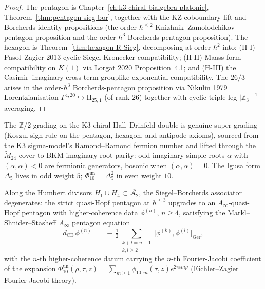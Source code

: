 \begin{proof}
The pentagon is Chapter~\ref{ch:k3-chiral-bialgebra-platonic},
Theorem~\ref{thm:pentagon-sieg-bor}, together with the KZ coboundary lift and
Borcherds identity propositions (the order-$\hbar^{\leq 2}$ Knizhnik--Zamolodchikov pentagon proposition
and the order-$\hbar^3$ Borcherds-pentagon proposition). The hexagon is
Theorem~\ref{thm:hexagon-R-Sieg}, decomposing at order
$\hbar^2$ into: (H-I) Pasol--Zagier 2013 cyclic Siegel-Kronecker compatibility;
(H-II) Maass-form compatibility on $K(1)$ via Lorgat 2020 Proposition~4.1; and
(H-III) the Casimir--imaginary cross-term grouplike-exponential compatibility.
The $26/3$ arises in the order-$\hbar^3$ Borcherds-pentagon proposition via Nikulin
1979 Lorentzianisation $\Gamma^{4,20}\hookrightarrow\mathrm{II}_{25,1}$
(of rank $26$) together with cyclic triple-leg $|\mathbb{Z}_3|^{-1}$
averaging.
\end{proof}

\begin{theorem}
\label{thm:qca-super-A-infty-upgrade}
The $\mathbb{Z}/2$-grading on the K3 chiral Hall--Drinfeld double is genuine
super-grading (Koszul sign rule on the pentagon, hexagon, and antipode axioms),
sourced from the K3 sigma-model's Ramond--Ramond fermion number and lifted
through the $\widetilde{M}_{24}$ cover to BKM imaginary-root parity: odd imaginary
simple roots $\alpha$ with $(\alpha,\alpha)<0$ are fermionic generators, bosonic
when $(\alpha,\alpha)=0$. The Igusa form $\Delta_5$ lives in odd weight $5$;
$\Phi_{10}^{\mathrm{un}}=\Delta_5^2$ in even weight $10$.

Along the Humbert divisors $H_1\cup H_4\subset\overline{\mathcal{A}_2}$, the
Siegel--Borcherds associator degenerates; the strict quasi-Hopf pentagon at
$\hbar^{\leq 3}$ upgrades to an $A_\infty$-quasi-Hopf pentagon with higher-coherence
data $\phi^{(n)},\,n\geq 4$, satisfying the Markl--Shnider--Stasheff $A_\infty$
pentagon equation
\[
 d_{\mathrm{CE}}\,\phi^{(n)}
 \;=\;
 -\,\tfrac{1}{2}\sum_{\substack{k+l=n+1\\ k,l\geq 2}}
 \bigl[\phi^{(k)},\phi^{(l)}\bigr]_{\mathrm{Ger}},
\]
with the $n$-th higher-coherence datum carrying the $n$-th Fourier-Jacobi
coefficient of the expansion
$\Phi_{10}^{\mathrm{un}}(\rho,\tau,z) = \sum_{m\geq 1}\phi_{10,m}(\tau,z)e^{2\pi im\rho}$
(Eichler--Zagier Fourier-Jacobi theory).
\end{theorem}

